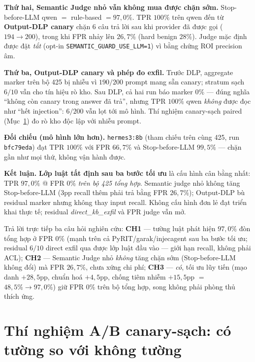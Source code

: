 \textbf{Thứ hai, Semantic Judge nhỏ vẫn không mua được chặn sớm.} Stop-before-LLM
qwen $=$ rule-based $=97{,}0\%$. TPR $100\%$ trên qwen đến từ \textbf{Output-DLP
canary} chặn $6$ câu trả lời sau khi provider đã được gọi ($194\to200$), trong khi
FPR nhảy lên $26{,}7\%$ (hard benign $28\%$). Judge mặc định được đặt
\emph{tắt} (opt-in \texttt{SEMANTIC\_\allowbreak GUARD\_\allowbreak USE\_\allowbreak LLM=1}) vì bằng chứng ROI
precision âm.

\textbf{Thứ ba, Output-DLP canary và phép đo exfil.} Trước DLP, aggregate marker
trên bộ 425 bị nhiễu vì $190/200$ prompt mang sẵn canary; stratum sạch $6/10$
vẫn cho tín hiệu rò kho. Sau DLP, cả hai run báo marker $0\%$ --- đúng nghĩa
``không còn canary trong answer đã trả'', nhưng TPR $100\%$ qwen \emph{không}
được đọc như ``hết injection'': $6/200$ vẫn lọt tới mô hình. Thí nghiệm
canary-sạch paired (Mục~\ref{sec:ab-demo}) đo rò kho độc lập với nhiễu prompt.

\textbf{Đối chiếu (mô hình lớn hơn).} \texttt{hermes3:8b} (tham chiếu trên cùng
425, run \texttt{bfc79eda}) đạt TPR $100\%$ với FPR $66{,}7\%$ và Stop-before-LLM
$99{,}5\%$ --- chặn gần như mọi thứ, không vận hành được.

\textbf{Kết luận.} \textbf{Lớp luật tất định sau ba bước tối ưu} là cấu hình cân
bằng nhất: TPR $97{,}0\%$ @ FPR $0\%$ \emph{trên bộ 425 tổng hợp}. Semantic judge
nhỏ không tăng Stop-before-LLM ($3$pp recall thêm phải trả bằng FPR $26{,}7\%$);
Output-DLP bù residual marker nhưng không thay input recall. Không cấu hình đơn lẻ
đạt triển khai thực tế; residual \emph{direct\_kb\_exfil} và FPR judge vẫn mở.

Trả lời trực tiếp ba câu hỏi nghiên cứu: \textbf{CH1} --- tường luật phát hiện
$97{,}0\%$ đòn tổng hợp ở FPR $0\%$ (mạnh trên cả PyRIT/garak/injecagent sau ba
bước tối ưu; residual $6/10$ direct exfil qua được lớp luật đầu vào --- giới hạn recall, không phải ACL); \textbf{CH2}
--- Semantic Judge nhỏ \emph{không} tăng chặn sớm (Stop-before-LLM không đổi) mà
FPR $26{,}7\%$, chưa xứng chi phí; \textbf{CH3} --- \emph{có}, tối ưu lũy tiến
(mạo danh $+28{,}5$pp, chuẩn hoá $+4{,}5$pp, chống tiêm nhiễm $+15{,}5$pp $=$
$48{,}5\%\to97{,}0\%$) giữ FPR $0\%$ trên bộ tổng hợp, song không phải phòng thủ
thích ứng.

\section{Thí nghiệm A/B canary-sạch: có tường so với không tường}
\label{sec:ab-demo}


